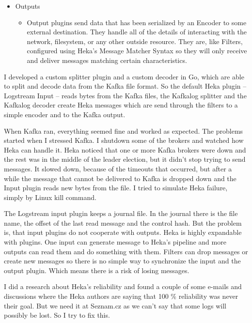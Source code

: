 \begin{itemize}
\begin{itemize}
    \end{itemize}
  \item	Outputs
    \begin{itemize}
      \item Output plugins send data that has been serialized by an Encoder to some external destination. They handle all of the details of interacting with the network, filesystem, or any other outside resource. They are, like Filters, configured using Heka’s Message Matcher Syntax so they will only receive and deliver messages matching certain characteristics.
    \end{itemize}
\end{itemize}

I developed a custom splitter plugin and a custom decoder in Go, which are able to split and decode data from the Kafka file format. So the default Heka plugin -- Logstream Input -- reads bytes from the Kafka files, the Kafkalog splitter and the Kafkalog decoder create Heka messages which are send through the filters to a simple encoder and to the Kafka output.

When Kafka ran, everything seemed fine and worked as expected. The problems started when I stressed Kafka. I shutdown some of the brokers and watched how Heka can handle it. Heka noticed that one or more Kafka brokers were down and the rest was in the middle of the leader election, but it didn’t stop trying to send messages. It slowed down, because of the timeouts that occurred, but after a while the message that cannot be delivered to Kafka is dropped down and the Input plugin reads new bytes from the file. I tried to simulate Heka failure, simply by Linux kill command.

The Logstream input plugin keeps a journal file. In the journal there is the file name, the offset of the last read message and the control hash. But the problem is, that input plugins do not cooperate with outputs. Heka is highly expandable with plugins. One input can generate message to Heka’s pipeline and more outputs can read them and do something with them. Filters can drop messages or create new messages so there is no simple way to synchronize the input and the output plugin. Which means there is a risk of losing messages.
 
I did a research about Heka’s reliability and found a couple of some e-mails and discussions where the Heka authors are saying that 100 \% reliability was never their goal. But we need it at Seznam.cz as we can’t say that some logs will possibly be lost. So I try to fix this.

